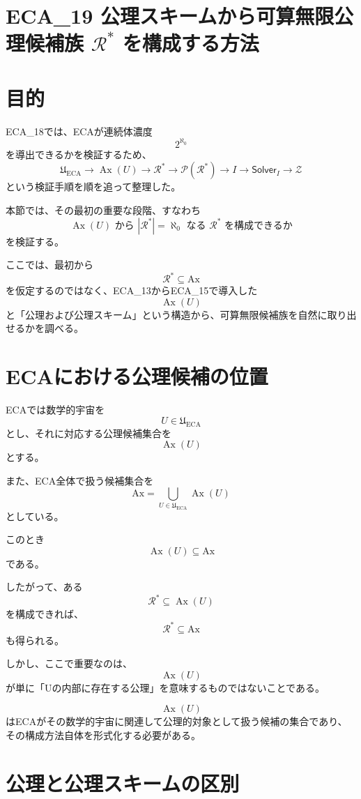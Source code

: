 \documentclass[a4paper,11pt]{article}
\newcommand{\Ax}{\mathrm{Ax}}
\newcommand{\Solver}{\mathsf{Solver}}
\begin{document}
\section{ECA_19 公理スキームから可算無限公理候補族 $\mathcal{R}^*$ を構成する方法}


\section{目的}

ECA_18では、ECAが連続体濃度
\[
2^{\aleph_0}
\]
を導出できるかを検証するため、
\[
\mathfrak U_{\mathrm{ECA}}
\to
\operatorname{Ax}(U)
\to
\mathcal{R}^*
\to
\mathcal{P}(\mathcal{R}^*)
\to
I
\to
\Solver_I
\to
\mathcal{Z}
\]
という検証手順を順を追って整理した。

本節では、その最初の重要な段階、すなわち
\[
\boxed{
\operatorname{Ax}(U)
\text{ から }
|\mathcal{R}^*|=\aleph_0
\text{ なる }
\mathcal{R}^*
\text{ を構成できるか}
}
\]
を検証する。

ここでは、最初から
\[
\mathcal{R}^*\subseteq\Ax
\]
を仮定するのではなく、ECA_13からECA_15で導入した
\[
\operatorname{Ax}(U)
\]
と「公理および公理スキーム」という構造から、可算無限候補族を自然に取り出せるかを調べる。

\section{ECAにおける公理候補の位置}

ECAでは数学的宇宙を
\[
U\in\mathfrak U_{\mathrm{ECA}}
\]
とし、それに対応する公理候補集合を
\[
\operatorname{Ax}(U)
\]
とする。

また、ECA全体で扱う候補集合を
\[
\Ax
=
\bigcup_{U\in\mathfrak U_{\mathrm{ECA}}}
\operatorname{Ax}(U)
\]
としている。

このとき
\[
\operatorname{Ax}(U)\subseteq\Ax
\]
である。

したがって、ある
\[
\mathcal{R}^*\subseteq\operatorname{Ax}(U)
\]
を構成できれば、
\[
\mathcal{R}^*\subseteq\Ax
\]
も得られる。

しかし、ここで重要なのは、
\[
\operatorname{Ax}(U)
\]
が単に「Uの内部に存在する公理」を意味するものではないことである。

\[
\operatorname{Ax}(U)
\]
はECAがその数学的宇宙に関連して公理的対象として扱う候補の集合であり、その構成方法自体を形式化する必要がある。

\section{公理と公理スキームの区別}
\end{document}
